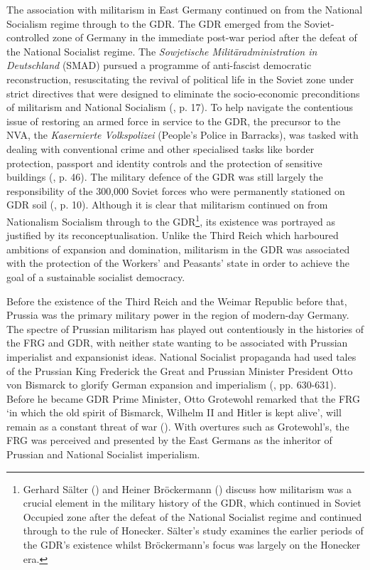 The association with militarism in East Germany continued on from the National Socialism regime through to the GDR. The GDR emerged from the Soviet-controlled zone of Germany in the immediate post-war period after the defeat of the National Socialist regime. The \textit{Sowjetische Militäradministration in Deutschland} (SMAD) pursued a programme of anti-fascist democratic reconstruction, resuscitating the revival of political life in the Soviet zone under strict directives that were designed to eliminate the socio-economic preconditions of militarism and National Socialism (\cite{dennis2000}, p. 17). To help navigate the contentious issue of restoring an armed force in service to the GDR, the precursor to the NVA, the \textit{Kasernierte Volkspolizei} (People’s Police in Barracks), was tasked with dealing with conventional crime and other specialised tasks like border protection, passport and identity controls and the protection of sensitive buildings (\cite{fullbrook1995}, p. 46). The military defence of the GDR was still largely the responsibility of the 300,000 Soviet forces who were permanently stationed on GDR soil (\cite{fullbrook1995}, p. 10). Although it is clear that militarism continued on from Nationalism Socialism through to the GDR\footnote{Gerhard Sälter (\citeyear{sälter2009}) and Heiner Bröckermann (\citeyear{bröckermann2011}) discuss how militarism was a crucial element in the military history of the GDR, which continued in Soviet Occupied zone after the defeat of the National Socialist regime and continued through to the rule of Honecker. Sälter’s study examines the earlier periods of the GDR’s existence whilst Bröckermann’s focus was largely on the Honecker era.}, its existence was portrayed as justified by its reconceptualisation. Unlike the Third Reich which harboured ambitions of expansion and domination, militarism in the GDR was associated with the protection of the Workers’ and Peasants’ state in order to achieve the goal of a sustainable socialist democracy.

Before the existence of the Third Reich and the Weimar Republic before that, Prussia was the primary military power in the region of modern-day Germany. The spectre of Prussian militarism has played out contentiously in the histories of the FRG and GDR, with neither state wanting to be associated with Prussian imperialist and expansionist ideas. National Socialist propaganda had used tales of the Prussian King Frederick the Great and Prussian Minister President Otto von Bismarck to glorify German expansion and imperialism (\cite{kroll2001}, pp. 630-631). Before he became GDR Prime Minister, Otto Grotewohl remarked that the FRG ‘in which the old spirit of Bismarck, Wilhelm II and Hitler is kept alive’, will remain as a constant threat of war (\cite{nd19490320}). With overtures such as Grotewohl’s, the FRG was perceived and presented by the East Germans as the inheritor of Prussian and National Socialist imperialism.

